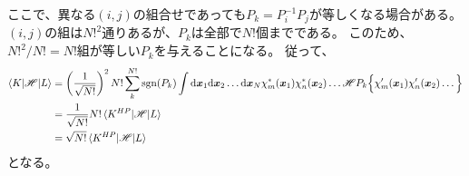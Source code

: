 ここで、異なる$(i,j)$の組合せであっても$P_k=P_i^{-1}P_j$が等しくなる場合がある。
$(i,j)$の組は$N!^2$通りあるが、$P_k$は全部で$N!$個までである。
このため、$N!^2/N!=N!$組が等しい$P_k$を与えることになる。
従って、
\begin{align}
	\braket{K|\mathscr{H}|L}
&=
	\left(
		\frac{1}{\sqrt{N!}}
	\right)^2
	N!
	\sum_k^{N!}
		\sgn(P_k)
		\int \d\x_1\d\x_2\dots\d\x_N
			\chi_m^\ast(\x_1) \chi_n^\ast(\x_2) \dots
			\mathscr{H}
			P_k\Bigl\{
				\chi_m'(\x_1) \chi_n'(\x_2) \dots
			\Bigr\} \\
%
%
&=
	\frac{1}{\sqrt{N!}}
	N!
	\braket{K^{HP}|\mathscr{H}|L} \\
%
%
&=
	\sqrt{N!}
	\braket{K^{HP}|\mathscr{H}|L}
\end{align}
となる。



